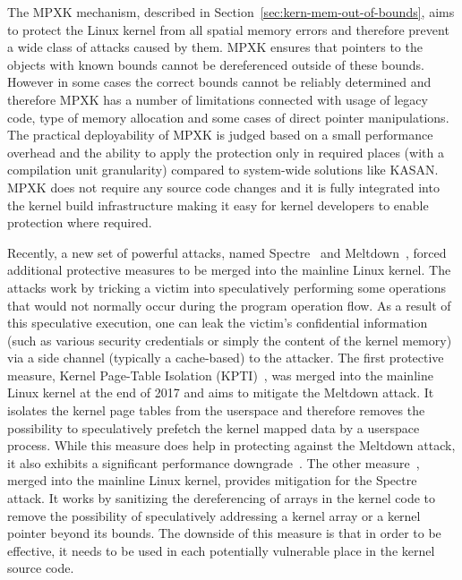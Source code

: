The MPXK mechanism, described in Section~\ref{sec:kern-mem-out-of-bounds}, aims to protect the Linux kernel from all spatial memory errors and therefore prevent a wide class of attacks caused by them. MPXK ensures that pointers to the objects with known bounds cannot be dereferenced outside of these bounds. However in some cases the correct bounds cannot be reliably determined and therefore MPXK has a number of limitations connected with usage of legacy code, type of memory allocation and some cases of direct pointer manipulations. The practical deployability of MPXK is judged based on a small performance overhead and the ability to apply the protection only in required places (with a compilation unit granularity) compared to system-wide solutions like KASAN. MPXK does not require any source code changes and it is fully integrated into the kernel build infrastructure making it easy for kernel developers to enable protection where required.  

Recently, a new set of powerful attacks, named Spectre~\cite{Kocher2018spectre} and Meltdown~\cite{Lipp2018meltdown}, forced additional protective measures to be merged into the mainline Linux kernel. The attacks work by tricking a victim into speculatively performing some operations that would not normally occur during the program operation flow. As a result of this speculative execution, one can leak the victim's confidential information (such as various security credentials or simply the content of the kernel memory) via a side channel (typically a cache-based) to the attacker. The first protective measure, Kernel Page-Table Isolation (KPTI)~\cite{kpti}, was merged into the mainline Linux kernel at the end of 2017 and aims to mitigate the Meltdown attack. It isolates the kernel page tables from the userspace and therefore removes the possibility to speculatively prefetch the kernel mapped data by a userspace process. While this measure does help in protecting against the Meltdown attack, it also exhibits a significant performance downgrade~\cite{kptiperf}. The other measure~\cite{variant1}, merged into the mainline Linux kernel, provides mitigation for the Spectre attack. It works by sanitizing the dereferencing of arrays in the kernel code to remove the possibility of speculatively addressing a kernel array or a kernel pointer beyond its bounds. The downside of this measure is that in order to be effective, it needs to be used in each potentially vulnerable place in the kernel source code.     
